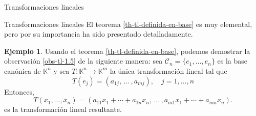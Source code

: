 \documentclass[a4paper,12pt,twoside,spanish,reqno]{amsbook}
\theoremstyle{definition}
\newtheorem{ejemplo}{Ejemplo}[section]
\theoremstyle{remark}
\newcommand{\K}{\mathbb K}
\begin{document}
\begin{chapter}{Transformaciones lineales}
\begin{section}{Transformaciones lineales}
		El teorema \ref{th-tl-definida-en-base} es muy elemental, pero por su importancia ha sido presentado
		detalladamente. 
		
			\begin{ejemplo} Usando el teorema \ref{th-tl-definida-en-base}, podemos demostrar la observación \ref{obs-tl-1.5} de la siguiente manera: sea  $\mathcal C_n = \{e_1,\ldots,e_n\}$ es la base canónica de $\K^n$ y  sea  $T: \K^n \to \K^m$ la única transformación lineal tal que 
			\begin{equation*}
			T(e_j)  = (a_{1j},\, \ldots\,,a_{mj} ), \quad j=1,\ldots,n
			\end{equation*}	
			Entonces, 
			\begin{equation*}
			T(x_1,\ldots,x_n) = (a_{11}x_1+\cdots + a_{1n}x_n,\, \ldots\,,a_{m1}x_1+\cdots + a_{mn}x_n ).
			\end{equation*}
			es la transformación lineal resultante.
		\end{ejemplo}
		

\end{section}
\end{chapter}
\end{document}
